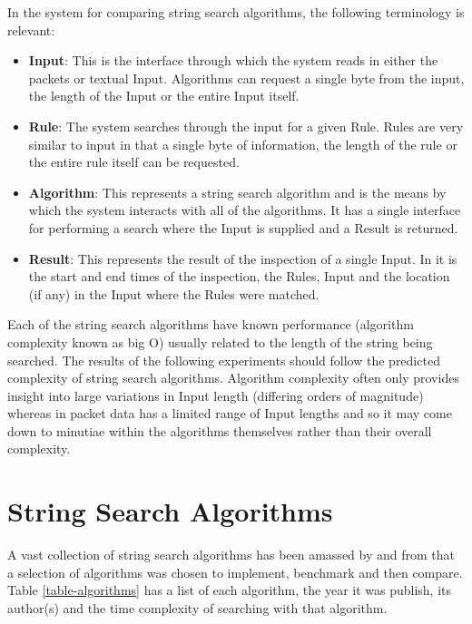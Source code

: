 \documentclass[11pt]{article}
\begin{document}
In the system for comparing string search algorithms, the following terminology is relevant:
\begin{itemize}
  \item \textbf{Input}: This is the interface through which the system reads in either the packets or textual Input. Algorithms can request a single byte from the input, the length of the Input or the entire Input itself.
  \item \textbf{Rule}: The system searches through the input for a given Rule. Rules are very similar to input in that a single byte of information, the length of the rule or the entire rule itself can be requested. 
  \item \textbf{Algorithm}: This represents a string search algorithm and is the means by which the system interacts with all of the algorithms. It has a single interface for performing a search where the Input is supplied and a Result is returned.
  \item \textbf{Result}: This represents the result of the inspection of a single Input. In it is the start and end times of the inspection, the Rules, Input and the location (if any) in the Input where the Rules were matched.
\end{itemize}

Each of the string search algorithms have known performance (algorithm complexity known as big O) usually related to the length of the string being searched. The results of the following experiments should follow the predicted complexity of string search algorithms. Algorithm complexity often only provides insight into large variations in Input length (differing orders of magnitude) whereas in packet data has a limited range of Input lengths and so it may come down to minutiae within the algorithms themselves rather than their overall complexity.

\section{String Search Algorithms}

A vast collection of string search algorithms has been amassed by \citet{charras2004} and from that a selection of algorithms was chosen to implement, benchmark and then compare.
Table \ref{table-algorithms} has a list of each algorithm, the year it was publish, its author(s) and the time complexity of searching with that algorithm.
\end{document}
